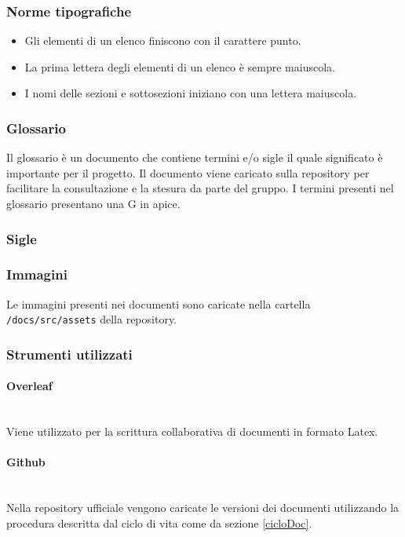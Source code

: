\documentclass{article}
\begin{document}
\subsubsection{Norme tipografiche}
\begin{itemize}
    \item Gli elementi di un elenco finiscono con il carattere punto.
    \item La prima lettera degli elementi di un elenco è sempre maiuscola.
    \item I nomi delle sezioni e sottosezioni iniziano con una lettera maiuscola.
\end{itemize}

\subsubsection{Glossario}
Il glossario è un documento che contiene termini e/o sigle il quale significato è importante per il progetto. Il documento viene caricato sulla repository per facilitare la consultazione e la stesura da parte del gruppo. I termini presenti nel glossario presentano una G in apice.

\subsubsection{Sigle}

\subsubsection{Immagini}
Le immagini presenti nei documenti sono caricate nella cartella \texttt{/docs/src/assets} della repository.


\subsubsection{Strumenti utilizzati}
\paragraph{Overleaf}~\\
Viene utilizzato per la scrittura collaborativa di documenti in formato Latex.
\paragraph{Github}~\\
Nella repository ufficiale vengono caricate le versioni dei documenti utilizzando la procedura descritta dal ciclo di vita come da sezione \ref{cicloDoc}.
\end{document}
